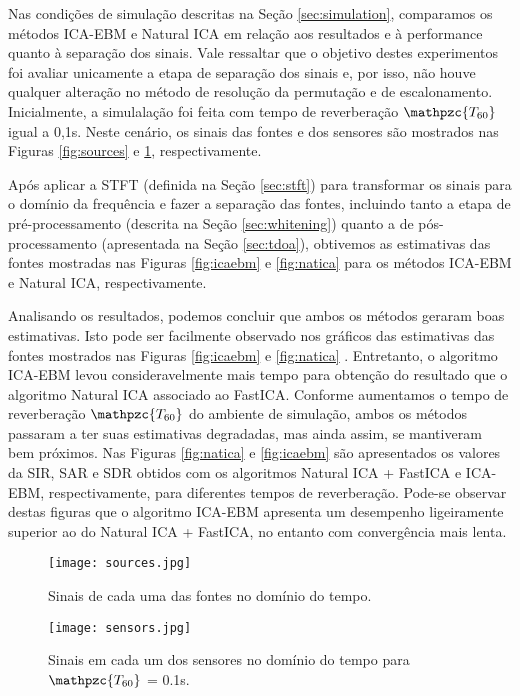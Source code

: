    Nas condições de simulação descritas na Seção \ref{sec:simulation}, comparamos os métodos ICA-EBM e Natural ICA em relação aos resultados e à performance quanto à separação dos sinais. Vale ressaltar que o objetivo destes experimentos foi avaliar unicamente a etapa de separação dos sinais e, por isso, não houve qualquer alteração no método de resolução da permutação e de escalonamento.  Inicialmente, a simulalação foi feita com tempo de reverberação $\mathpzc{T_{60}}$ igual a 0,1s. Neste cenário, os sinais das fontes e dos sensores são mostrados nas Figuras \ref{fig:sources} e \ref{fig:sensors}, respectivamente.
    
    Após aplicar a STFT (definida na Seção \ref{sec:stft}) para transformar os sinais para o domínio da frequência e fazer a separação das fontes, incluindo tanto a etapa de pré-processamento (descrita na Seção \ref{sec:whitening}) quanto a de pós-processamento (apresentada na Seção \ref{sec:tdoa}), obtivemos as estimativas das fontes mostradas nas Figuras \ref{fig:icaebm} e \ref{fig:natica} para os métodos ICA-EBM e Natural ICA, respectivamente.
    
    Analisando os resultados, podemos concluir que ambos os métodos geraram boas estimativas. Isto pode ser facilmente observado nos gráficos das estimativas das fontes mostrados nas Figuras \ref{fig:icaebm} e \ref{fig:natica} . Entretanto, o algoritmo ICA-EBM levou consideravelmente mais tempo para obtenção do resultado que o algoritmo Natural ICA associado ao FastICA. Conforme aumentamos o tempo de reverberação $\mathpzc{T_{60}}$ do ambiente de simulação, ambos os métodos passaram a ter suas estimativas degradadas, mas ainda assim, se mantiveram bem próximos. Nas Figuras \ref{fig:natica} e \ref{fig:icaebm} são apresentados os valores da SIR, SAR e SDR obtidos com os algoritmos Natural ICA + FastICA e ICA-EBM, respectivamente, para diferentes tempos de reverberação. Pode-se observar destas figuras que o algoritmo ICA-EBM apresenta um desempenho ligeiramente superior ao do Natural ICA + FastICA, no entanto com convergência mais lenta.
    
    \begin{figure}
        \centering
        \texttt{[image: sources.jpg]}
            \caption{Sinais de cada uma das fontes no domínio do tempo.}
        \label{fig:sources}
        \texttt{[image: sensors.jpg]}
            \caption{Sinais em cada um dos sensores no domínio do tempo para $\mathpzc{T_{60}}$ = 0.1s.}
        \label{fig:sensors}
    \end{figure}
    
